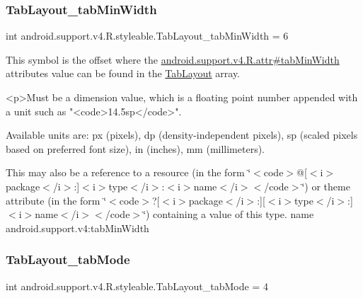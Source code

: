 \subsubsection{\texorpdfstring{Tab\+Layout\+\_\+tab\+Min\+Width}{TabLayout\_tabMinWidth}}
{\footnotesize\ttfamily int android.\+support.\+v4.\+R.\+styleable.\+Tab\+Layout\+\_\+tab\+Min\+Width = 6\hspace{0.3cm}{\ttfamily [static]}}

This symbol is the offset where the \hyperlink{classandroid_1_1support_1_1v4_1_1R_1_1attr_af1e0e4313ae239f4f9b041b85893ed7e}{android.\+support.\+v4.\+R.\+attr\#tab\+Min\+Width} attribute\textquotesingle{}s value can be found in the \hyperlink{classandroid_1_1support_1_1v4_1_1R_1_1styleable_a48e866d7121b40ef0bb3d467759606a9}{Tab\+Layout} array.

\begin{DoxyVerb}      <p>Must be a dimension value, which is a floating point number appended with a unit such as "<code>14.5sp</code>".
\end{DoxyVerb}
 Available units are\+: px (pixels), dp (density-\/independent pixels), sp (scaled pixels based on preferred font size), in (inches), mm (millimeters). 

This may also be a reference to a resource (in the form \char`\"{}$<$code$>$@\mbox{[}$<$i$>$package$<$/i$>$\+:\mbox{]}$<$i$>$type$<$/i$>$\+:$<$i$>$name$<$/i$>$$<$/code$>$\char`\"{}) or theme attribute (in the form \char`\"{}$<$code$>$?\mbox{[}$<$i$>$package$<$/i$>$\+:\mbox{]}\mbox{[}$<$i$>$type$<$/i$>$\+:\mbox{]}$<$i$>$name$<$/i$>$$<$/code$>$\char`\"{}) containing a value of this type.  name android.\+support.\+v4\+:tab\+Min\+Width \mbox{\label{classandroid_1_1support_1_1v4_1_1R_1_1styleable_a7c5dda59a3cd0a09b99263ba97c5f0d0}} 
\subsubsection{\texorpdfstring{Tab\+Layout\+\_\+tab\+Mode}{TabLayout\_tabMode}}
{\footnotesize\ttfamily int android.\+support.\+v4.\+R.\+styleable.\+Tab\+Layout\+\_\+tab\+Mode = 4\hspace{0.3cm}{\ttfamily [static]}}

